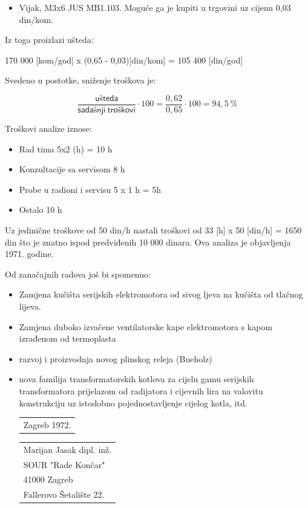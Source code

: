 \documentclass[a4paper,12pt]{article}
\numberwithin{figure}{section}
\begin{document}
\begin{itemize}
\item Vijak, M3x6 JUS MB1.103. Moguće ga je kupiti u trgovini uz cijenu 0,03 din/kom.
\end{itemize}
\begin{figure}
  \vspace{-20pt}
  \begin{center}
    
  \end{center}

\end{figure}
\FloatBarrier
Iz toga proizlazi ušteda:
\begin{center}
170 000 [kom/god] x (0,65 - 0,03)[din/kom] = 105 400 [din/god]
\end{center}
Svedeno u postotke, sniženje troškova je:
\begin{center}
\begin{equation*}
\frac{\mathsf{ušteda}}{\mathsf{sadašnji\: troškovi}} \cdot 100 = \frac{0,62}{0,65} \cdot 100 = 94,5\:
\%
\end{equation*}
\end{center}
Troškovi analize iznose:
\begin{itemize}
\item Rad tima 5x2 (h) = 10 h
\item Konzultacije sa servisom 8 h
\item Probe u radioni i servisu 5 x 1 h = 5h
\item Ostalo 10 h
\end{itemize}
Uz jedinične troškove od 50 din/h nastali troškovi od 33 [h] x 50 [din/h] = 1650 din što je znatno ispod predviđenih 10 000 dinara. Ova analiza je objavljenja 1971. godine.\par
Od zanačajnih radova još bi spomenuo:
\begin{itemize}
\item Zamjena kučišta serijskih elektromotora od sivog ljeva na kučišta od tlačnog lijeva. 
\item Zamjena duboko izvačene ventilatorske kape elektromotora s kapom izrađenom od termoplasta
\item razvoj i proizvodnja novog plinskog releja (Bueholz)
\item nova familija transformatorskih kotlova za cijelu gamu serijskih transformatora prijelazom od radijatora i cijevnih lira na valovitu konstrukciju uz istodobno pojednostavljenje cijelog kotla, itd.\\


\vfill\noindent
\begin{tabular}[t]{@{}l} 
  Zagreb 1972.
\end{tabular}
\hfill%
\begin{tabular}[t]{l@{}}
Marijan Jasak dipl. inž.\\
SOUR "Rade Končar"\\
41000 Zagreb\\
Fallerovo Šetalište 22.
\end{tabular}

\end{itemize}
\end{document}
